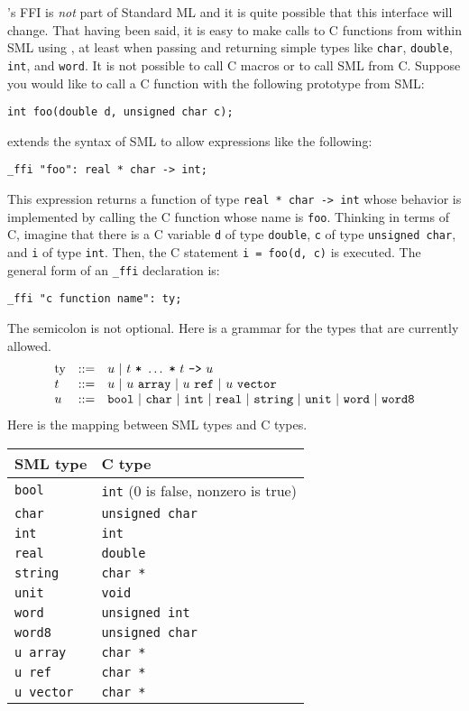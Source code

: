 
{\mlton}'s FFI is {\em not} part of Standard ML and it is quite possible that
this interface will change.  That having been said, it is easy to make calls to
C functions from within SML using {\mlton}, at least when passing and returning
simple types like {\tt char}, {\tt double}, {\tt int}, and {\tt word}.  It is
not possible to call C macros or to call SML from C.  Suppose you would like to
call a C function with the following prototype from SML:
\begin{verbatim}
int foo(double d, unsigned char c);
\end{verbatim}
{\mlton} extends the syntax of SML to allow expressions like the following:
\begin{verbatim}
_ffi "foo": real * char -> int;
\end{verbatim}
This expression returns a function of type {\tt real * char -> int}
whose behavior is implemented by calling the C function whose name is
{\tt foo}.  Thinking in terms of C, imagine that there is a C
variable {\tt d} of type {\tt double}, {\tt c} of type {\tt unsigned
char}, and {\tt i} of type {\tt int}.  Then, the C statement
\mbox{\tt i = foo(d, c)} is executed.
The general form of an \verb+_ffi+ declaration is:
\begin{verbatim}
_ffi "c function name": ty;
\end{verbatim}
The semicolon is not optional.  Here is a grammar for the types that
are currently allowed.
\[
\begin{array}{lcl}
\mbox{ty} & ::= & u \ |\  t\ \mbox{\tt *}\ \ldots\ \mbox{\tt *}\ t\ \mbox{\tt ->}\ u\\
t & ::= & u \ |\  u\ \mbox{\tt array} \ |\  u\ \mbox{\tt ref}
             \ |\  u\ \mbox{\tt vector}\\
u & ::= & \mbox{\tt bool} \ |\  \mbox{\tt char} \ |\  \mbox{\tt int} \ |\  \mbox{\tt real} \ |\  \mbox{\tt string} \ |\  \mbox{\tt unit} \ |\  \mbox{\tt word} \ |\  \mbox{\tt word8}\\
\end{array}
\]
Here is the mapping between SML types and C types.
\begin{center}
\begin{tabular}{ll}
SML type & C type\\
\hline
{\tt bool} & {\tt int} (0 is false, nonzero is true) \\
{\tt char} & {\tt unsigned char} \\
{\tt int} & {\tt int} \\
{\tt real} & {\tt double} \\
{\tt string} & {\tt char *} \\
{\tt unit} & {\tt void} \\
{\tt word} & {\tt unsigned int} \\
{\tt word8} & {\tt unsigned char} \\
{\tt u array} & {\tt char *} \\
{\tt u ref} & {\tt char *} \\
{\tt u vector} & {\tt char *} \\
\end{tabular}
\end{center}
